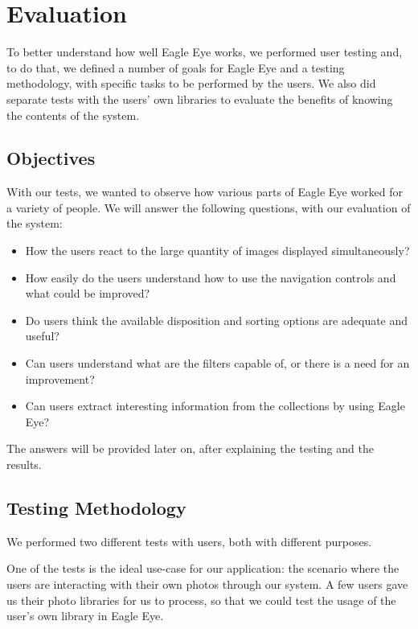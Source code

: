 \chapter{Evaluation} %
\label{chapter:evaluation}


To better understand how well Eagle Eye works, we performed user testing and, to do that, we defined a number of goals for Eagle Eye and a testing methodology, with specific tasks to be performed by the users. We also did separate tests with the users' own libraries to evaluate the benefits of knowing the contents of the system.





\section{Objectives}

With our tests, we wanted to observe how various parts of Eagle Eye worked for a variety of people. 
We will answer the following questions, with our evaluation of the system:

\begin{itemize}
\item How the users react to the large quantity of images displayed simultaneously?
\item How easily do the users understand how to use the navigation controls and what could be improved?
\item Do users think the available disposition and sorting options are adequate and useful?
\item Can users understand what are the filters capable of, or there is a need for an improvement?
\item Can users extract interesting information from the collections by using Eagle Eye?
\end{itemize}

The answers will be provided later on, after explaining the testing and the results.




\section{Testing Methodology}

We performed two different tests with users, both with different purposes.

One of the tests is the ideal use-case for our application: the scenario where the users are interacting with their own photos through our system. A few users gave us their photo libraries for us to process, so that we could test the usage of the user's own library in Eagle Eye.


